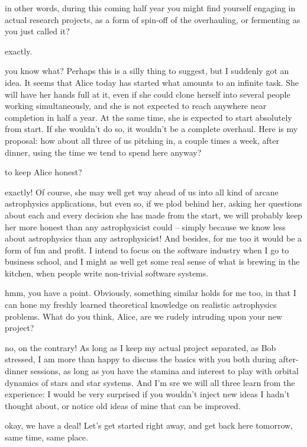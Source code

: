 \documentclass{book}
\def\alice{\item[Alice:]}
\def\bob{\item[Bob:]}
\def\carol{\item[Carol:]}
\begin{document}
\carol
in other words, during this coming half year you might find
yourself engaging in actual research projects, as a form of spin-off
of the overhauling, or fermenting as you just called it?

\alice
exactly.

\bob
you know what?  Perhaps this is a silly thing to suggest, but I
suddenly got an idea.  It seems that Alice today has started what
amounts to an infinite task.  She will have her hands full at it, even
if she could clone herself into several people working simultaneously,
and she is not expected to reach anywhere near completion in half a year.
At the same time, she is expected to start absolutely from start.  If
she wouldn't do so, it wouldn't be a complete overhaul.  Here is my
proposal: how about all three of us pitching in, a couple times a
week, after dinner, using the time we tend to spend here anyway?

\carol
to keep Alice honest?

\bob
exactly!  Of course, she may well get way ahead of us into all
kind of arcane astrophysics applications, but even so, if we plod
behind her, asking her questions about each and every decision she has
made from the start, we will probably keep her more honest than any
astrophysicist could -- simply because we know less about astrophysics
than any astrophysicist!  And besides, for me too it would be a form of
fun and profit.  I intend to focus on the software industry when I go
to business school, and I might as well get some real sense of what is
brewing in the kitchen, when people write non-trivial software systems.

\carol
hmm, you have a point.  Obviously, something similar holds for
me too, in that I can hone my freshly learned theoretical knowledge on
realistic astrophysics problems.  What do you think, Alice, are we
rudely intruding upon your new project?

\alice
no, on the contrary!  As long as I keep my actual project
separated, as Bob stressed, I am more than happy to discuss the basics
with you both during after-dinner sessions, as long as you have the
stamina and interest to play with orbital dynamics of stars and star
systems.  And I'm sre we will all three learn from the experience: I
would be very surprised if you wouldn't inject new ideas I hadn't
thought about, or notice old ideas of mine that can be improved.

\bob
okay, we have a deal!  Let's get started right away, and get back
here tomorrow, same time, same place.
\end{document}
